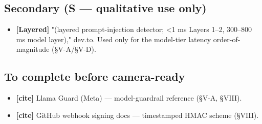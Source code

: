 \subsection{Secondary (S --- qualitative use
only)}\label{secondary-s--qualitative-use-only}

\begin{itemize}
\tightlist
\item
  \textbf{{[}Layered{]}} "(layered prompt-injection detector; \textless1
  ms Layers 1--2, 300--800 ms model layer)," dev.to. Used only for the
  model-tier latency order-of-magnitude (§V-A/§V-D).
\end{itemize}

\subsection{To complete before
camera-ready}\label{to-complete-before-camera-ready}

\begin{itemize}
\tightlist
\item
  \textbf{{[}cite{]}} Llama Guard (Meta) --- model-guardrail reference
  (§V-A, §VIII).
\item
  \textbf{{[}cite{]}} GitHub webhook signing docs --- timestamped HMAC
  scheme (§VIII).
\end{itemize}

